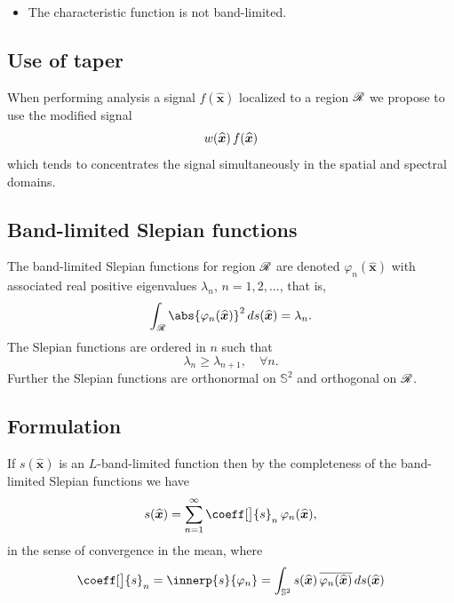 \documentclass[10pt, twocolumn, twoside]{IEEEtran}
\newcommand{\untsph}{\mathbb{S}^{2}} %
\newcommand{\unit}[1]{\widehat{\bm{#1}}}
\newcommand{\conj}[1]{\overline{#1}} %
\begin{document}
\begin{bibunit}
\begin{itemize}
\item
The characteristic function is not band-limited.
\end{itemize}


\subsection{Use of taper}

When performing analysis a signal $f(\unit{x})$ localized to a region $\mathscr{R}$ we propose to use the modified signal
\[
\taper(\unit{x})\,f(\unit{x})
\]
which tends to concentrates the signal simultaneously in the spatial and spectral domains.

\subsection{Band-limited Slepian functions}

The band-limited Slepian functions for region $\mathscr{R}$ are denoted
$\varphi_n(\unit{x})$
with associated real positive eigenvalues $\lambda_n$, $n=1,2,\dotsc$, that is,
\[
\int_{\R} \abs{\varphi_n(\unit{x})}^2\,ds(\unit{x}) = \lambda_n.
\]
The Slepian functions are ordered in $n$ such that
\[
\lambda_n\geq\lambda_{n+1},\quad \forall n.
\]
Further the Slepian functions are orthonormal on $\untsph$ and orthogonal on $\mathscr{R}$.


\newcommand{\band}{s}
\newcommand{\bandt}{\band^{\lambda}}

\subsection{Formulation}

If $\band(\unit{x})$ is an $L$-band-limited function then by the completeness of the band-limited Slepian functions we have
\begin{equation}
\label{eqn:expan}
\band(\unit{x}) =
\sum_{n=1}^\infty \coeff[\big]{\band}_n\,\varphi_n(\unit{x}),
\end{equation}
in the sense of convergence in the mean, where
\begin{equation}
\label{eqn:coeff}
\coeff[\big]{\band}_n =
\innerp{\band}{\varphi_n} =
\int_{\untsph} \band(\unit{x})\,\conj{\varphi_n(\unit{x})}\,ds(\unit{x})
\end{equation}


\end{bibunit}
\end{document}

